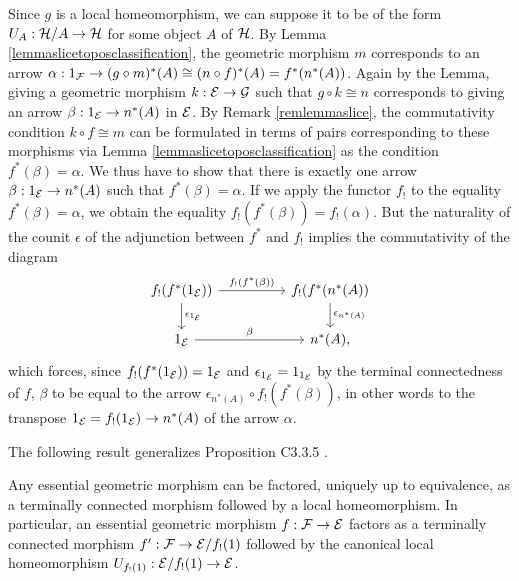 \documentclass[a4paper,12pt]{article}
\begin{document}
\begin{proofs}
Since $g$ is a local homeomorphism, we can suppose it to be of the form $U_{A}:{\cal H}\slash A \to {\cal H}$ for some object $A$ of $\cal H$. By Lemma \ref{lemmaslicetoposclassification}, the geometric morphism $m$ corresponds to an arrow $\alpha:1_{\cal F}\to (g\circ m)^{\ast}(A)\cong (n\circ f)^{\ast}(A)=f^{\ast}(n^{\ast}(A))$. Again by the Lemma, giving a geometric morphism $k:{\cal E}\to {\cal G}$ such that $g\circ k\cong n$ corresponds to giving an arrow $\beta:1_{\cal E}\to n^{\ast}(A)$ in $\cal E$. By Remark \ref{remlemmaslice}, the commutativity condition $k\circ f\cong m$ can be formulated in terms of pairs corresponding to these morphisms via Lemma \ref{lemmaslicetoposclassification} as the condition $f^{\ast}(\beta)=\alpha$. We thus have to show that there is exactly one arrow $\beta:1_{\cal E}\to n^{\ast}(A)$ such that $f^{\ast}(\beta)=\alpha$. If we apply the functor $f_{!}$ to the equality $f^{\ast}(\beta)=\alpha$, we obtain the equality $f_{!}(f^{\ast}(\beta))=f_{!}(\alpha)$. But the naturality of the counit $\epsilon$ of the adjunction between $f^{\ast}$ and $f_{!}$ implies the commutativity of the diagram
  \begin{equation*}
  \begin{tikzcd}
  f_{!}(f^{\ast}(1_{\cal E})) \arrow[rr, "f_{!}(f^{\ast}(\beta))"]   \arrow[d, "\epsilon_{1_{\cal E}}"]   & &  f_{!}(f^{\ast}(n^{\ast}(A))  \arrow[d, "\epsilon_{n^{\ast}(A)}"]  \\
  1_{\cal E} \ar[rr, "\beta"] & & n^{\ast}(A),   
  \end{tikzcd}
  \end{equation*} 
which forces, since $f_{!}(f^{\ast}(1_{\cal E}))=1_{\cal E}$ and $\epsilon_{1_{\cal E}}=1_{1_{\cal E}}$ by the terminal connectedness of $f$, $\beta$ to be equal to the arrow $\epsilon_{n^{\ast}(A)}\circ f_{!}(f^{\ast}(\beta))$, in other words to the transpose $1_{\cal E}=f_{!}(1_{\cal E})\to n^{\ast}(A)$ of the arrow $\alpha$.
\end{proofs}

The following result generalizes Proposition C3.3.5 \cite{El}.

\begin{proposition}\label{propfactorizationdiscrete}
Any essential geometric morphism can be factored, uniquely up to 
equivalence, as a terminally connected morphism followed by a local
homeomorphism. In particular, an essential geometric morphism $f:{\cal F}\to {\cal E}$ factors as a terminally connected morphism $f':{\cal F}\to {\cal E}\slash f_{!}(1)$ followed by the canonical local homeomorphism $U_{f_{!}(1)}:{\cal E}\slash f_{!}(1) \to {\cal E}$. 
\end{proposition}
\end{document}
